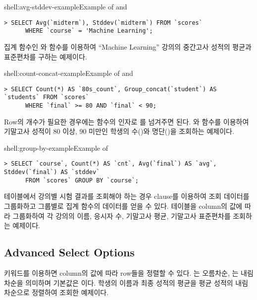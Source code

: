 \begin{shellenv}{shell:avg-stddev-example}{Example of  and }\begin{verbatim}
> SELECT Avg(`midterm`), Stddev(`midterm`) FROM `scores`
      WHERE `course` = 'Machine Learning';
\end{verbatim}
\end{shellenv}

\은 집계 함수인 와  함수를 이용하여 ``Machine Learning'' 강의의 중간고사 성적의 평균과 표준편차를 구하는 예제이다.

\begin{shellenv}{shell:count-concat-example}{Example of  and }
\begin{verbatim}
> SELECT Count(*) AS `80s_count`, Group_concat(`student`) AS `students` FROM `scores`
      WHERE `final` >= 80 AND `final` < 90;
\end{verbatim}
\end{shellenv}

Row의 개수가 필요한 경우에는  함수의 인자로 \cd{*}를 넘겨주면 된다. \은 와  함수를 이용하여 기말고사 성적이 80 이상, 90 미만인 학생의 수()와 명단()을 조회하는 예제이다.
\clearpage

\begin{shellenv}{shell:group-by-example}{Example of }
\begin{verbatim}
> SELECT `course`, Count(*) AS `cnt`, Avg(`final`) AS `avg`, Stddev(`final`) AS `stddev`
      FROM `scores` GROUP BY `course`;
\end{verbatim}
\end{shellenv}

 테이블에서 강의별 시험 결과를 조회해야 하는 경우  clause를 이용하여 조회 데이터를 그룹화하고 그룹별로 집계 함수의 데이터를 얻을 수 있다. \은  테이블을  column의 값에 따라 그룹화하여 각 강의의 이름, 응시자 수, 기말고사 평균, 기말고사 표준편차를 조회하는 예제이다.

\subsection*{Advanced Select Options}

 키워드를 이용하면 column의 값에 따라 row들을 정렬할 수 있다. 는 오름차순, 는 내림차순을 의미하며 기본값은 이다. \은 학생의 이름과 최종 성적의 평균을 평균 성적의 내림차순으로 정렬하여 조회한 예제이다.

